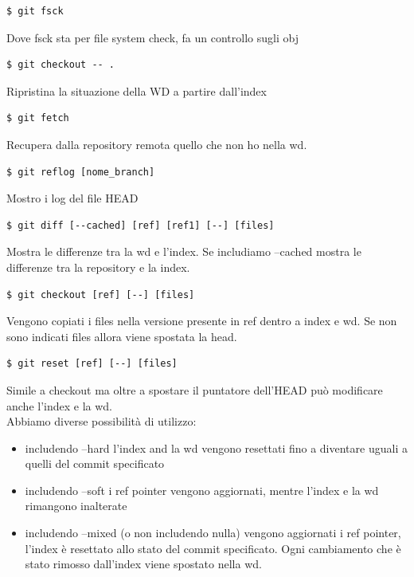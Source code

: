 \begin{verbatim}
$ git fsck
\end{verbatim}
Dove fsck sta per file system check, fa un controllo sugli obj 

\begin{verbatim}
$ git checkout -- .
\end{verbatim}
Ripristina la situazione della WD a partire dall'index

\begin{verbatim}
$ git fetch
\end{verbatim}
Recupera dalla repository remota quello che non ho nella wd.

\begin{verbatim}
$ git reflog [nome_branch]
\end{verbatim}
Mostro i log del file HEAD

\begin{verbatim}
$ git diff [--cached] [ref] [ref1] [--] [files]
\end{verbatim}
Mostra le differenze tra la wd e l'index. Se includiamo --cached mostra le differenze tra la repository e la index.

\begin{verbatim}
$ git checkout [ref] [--] [files]
\end{verbatim}
Vengono copiati i files nella versione presente in ref dentro a index e wd. Se non sono indicati files allora viene spostata la head.

\begin{verbatim}
$ git reset [ref] [--] [files]
\end{verbatim}
Simile a checkout ma oltre a spostare il puntatore dell'HEAD può modificare anche l'index e la wd.\\
Abbiamo diverse possibilità di utilizzo:
\begin{itemize}
    \item includendo --hard l'index and la wd vengono resettati fino a diventare uguali a quelli del commit specificato
    \item includendo --soft i ref pointer vengono aggiornati, mentre l'index e la wd rimangono inalterate
    \item includendo --mixed (o non includendo nulla) vengono aggiornati i ref pointer, l'index è resettato allo stato del commit specificato. Ogni cambiamento che è stato rimosso dall'index viene spostato nella wd.
\end{itemize}

